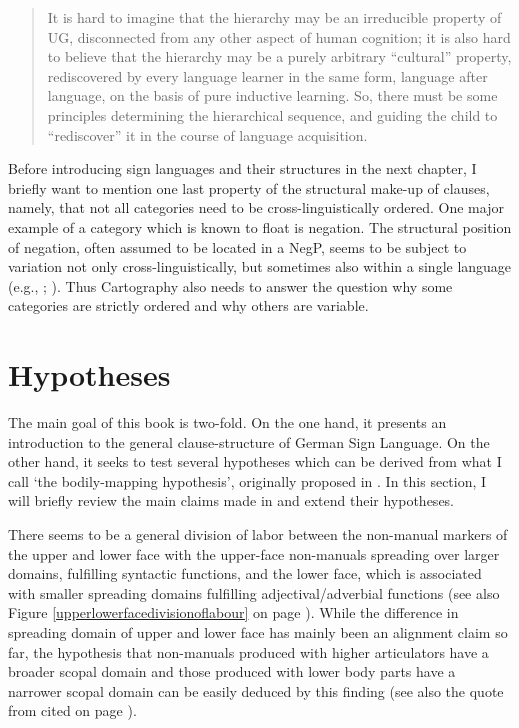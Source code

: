 \begin{quote}
It is hard to imagine that the hierarchy may be an irreducible property of UG, disconnected from any other aspect of human cognition; it is also hard to believe that the hierarchy may be a purely arbitrary ``cultural'' property, rediscovered by every language learner in the same form, language after language, on the basis of pure inductive learning. So, there must be some principles determining the hierarchical sequence, and guiding the child to ``rediscover'' it in the course of language acquisition. \citep[52]{cinque2008cartography}
\end{quote}

\noindent Before introducing sign languages and their structures in the next chapter, I briefly want to mention one last property of the structural make-up of clauses, namely, that not all categories need to be cross-linguistically ordered. One major example of a category which is known to float is negation. The structural position of negation, often assumed to be located in a NegP, seems to be subject to variation not only cross-linguistically, but sometimes also within a single language (e.g., \citealt{ouhalla1990sentential, ouhalla1991functional}; \citealt{zanuttini1991syntactic}). Thus Cartography also needs to answer the question why some categories are strictly ordered and why others are variable.




\section{Hypotheses}\label{hypotheses}
The main goal of this book is two-fold. On the one hand, it presents an introduction to the general clause-structure of German Sign Language. On the other hand, it seeks to test several hypotheses which can be derived from what I call `the bodily-mapping hypothesis', originally proposed in \citet{bross2017scope}. In this section, I will briefly review the main claims made in \citet{bross2017scope} and extend their hypotheses. %

There seems to be a general division of labor between the non-manual markers of the upper and lower face with the upper-face non-manuals spreading over larger domains, fulfilling syntactic functions, and the lower face, which is associated with smaller spreading domains fulfilling adjectival/adverbial functions (see also Figure \ref{upperlowerfacedivisionoflabour} on page \pageref{upperlowerfacedivisionoflabour}). While the difference in spreading domain of upper and lower face has mainly been an alignment claim so far, the hypothesis that non-manuals produced with higher articulators have a broader scopal domain and those produced with lower body parts have a narrower scopal domain can be easily deduced by this finding (see also the quote from \citealt[249]{wilbur2009productive} cited on page \pageref{wilburquote}). 

